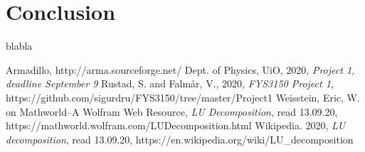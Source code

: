 \documentclass[reprint, english,notitlepage]{revtex4-1}  %
\begin{document}
\section{Conclusion}

blabla



\onecolumngrid
\vspace{1cm} %
\newpage

\begin{thebibliography}{}
   Armadillo, http://arma.sourceforge.net/
   Dept. of Physics, UiO,  2020, \textit{Project 1, deadline September 9}
   Rustad, S. and Falmår, V.,  2020, \textit{FYS3150 Project 1}, https://github.com/sigurdru/FYS3150/tree/master/Project1
   Weisstein, Eric, W. on Mathworld--A Wolfram Web Resource, \textit{LU Decomposition}, read 13.09.20, https://mathworld.wolfram.com/LUDecomposition.html
   Wikipedia.  2020, \textit{LU decomposition}, read 13.09.20, https://en.wikipedia.org/wiki/LU\_decomposition
\end{thebibliography}
\end{document}

